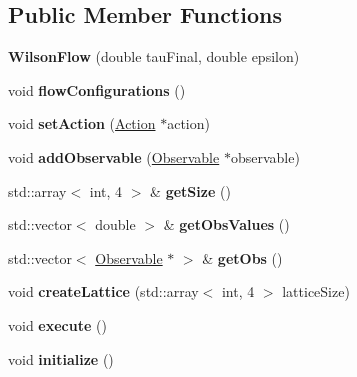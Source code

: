 \subsection*{Public Member Functions}
\begin{DoxyCompactItemize}
\item 
{\bfseries Wilson\+Flow} (double tau\+Final, double epsilon)\hypertarget{classWilsonFlow_a0ab55b82c101e093397192bbfa658609}{}\label{classWilsonFlow_a0ab55b82c101e093397192bbfa658609}

\item 
void {\bfseries flow\+Configurations} ()\hypertarget{classWilsonFlow_aff7b61f80cd9d4aa6d19e7281b2016d1}{}\label{classWilsonFlow_aff7b61f80cd9d4aa6d19e7281b2016d1}

\item 
void {\bfseries set\+Action} (\hyperlink{classAction}{Action} $\ast$action)\hypertarget{classWilsonFlow_a6b9ddd40b8165511df3fced3405ed593}{}\label{classWilsonFlow_a6b9ddd40b8165511df3fced3405ed593}

\item 
void {\bfseries add\+Observable} (\hyperlink{classObservable}{Observable} $\ast$observable)\hypertarget{classWilsonFlow_a0298e3a3e1b963c127abca860b61a4a4}{}\label{classWilsonFlow_a0298e3a3e1b963c127abca860b61a4a4}

\item 
std\+::array$<$ int, 4 $>$ \& {\bfseries get\+Size} ()\hypertarget{classWilsonFlow_ad00fa2dc5a90ae26bef6cd99ec90edc0}{}\label{classWilsonFlow_ad00fa2dc5a90ae26bef6cd99ec90edc0}

\item 
std\+::vector$<$ double $>$ \& {\bfseries get\+Obs\+Values} ()\hypertarget{classWilsonFlow_adcdb166df76bbc40c0076f326a431314}{}\label{classWilsonFlow_adcdb166df76bbc40c0076f326a431314}

\item 
std\+::vector$<$ \hyperlink{classObservable}{Observable} $\ast$ $>$ \& {\bfseries get\+Obs} ()\hypertarget{classWilsonFlow_a7105cd0a7a50a6775aadf9f717ff3478}{}\label{classWilsonFlow_a7105cd0a7a50a6775aadf9f717ff3478}

\item 
void {\bfseries create\+Lattice} (std\+::array$<$ int, 4 $>$ lattice\+Size)\hypertarget{classWilsonFlow_a1ae84f31a7b54b423bbe1d76001468d1}{}\label{classWilsonFlow_a1ae84f31a7b54b423bbe1d76001468d1}

\item 
void {\bfseries execute} ()\hypertarget{classWilsonFlow_a300944faffcb90c69ba9e2b62fd31561}{}\label{classWilsonFlow_a300944faffcb90c69ba9e2b62fd31561}

\item 
void {\bfseries initialize} ()\hypertarget{classWilsonFlow_afc84f29eab27e12f9ff51417dd6cf984}{}\label{classWilsonFlow_afc84f29eab27e12f9ff51417dd6cf984}

\end{DoxyCompactItemize}
